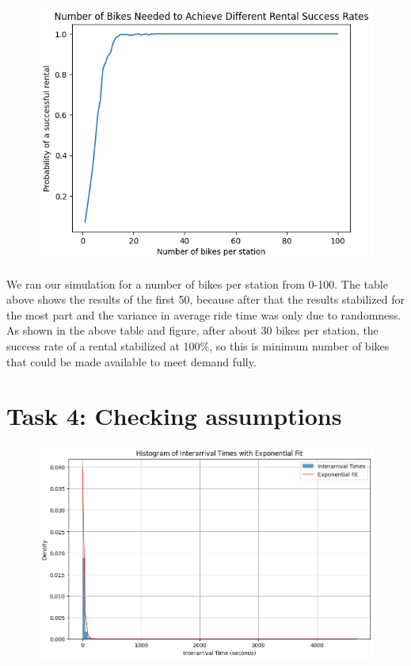 \documentclass{article}
\begin{document}
\begin{figure}[!h]
    \centering
    \includegraphics[width=0.9\linewidth]{assets/3.png}
\end{figure}
We ran our simulation for a number of bikes per station from 0-100. The table above shows the results of the first 50, because after that the results stabilized for the most part and the variance in average ride time was only due to randomness. As shown in the above table and figure, after about 30 bikes per station, the success rate of a rental stabilized at 100\%, so this is minimum number of bikes that could be made available to meet demand fully.

\newpage
\section{Task 4: Checking assumptions}
\begin{figure}[!h]
    \centering
    \includegraphics[width=0.9\linewidth]{assets/4.png}
\end{figure}
\end{document}
